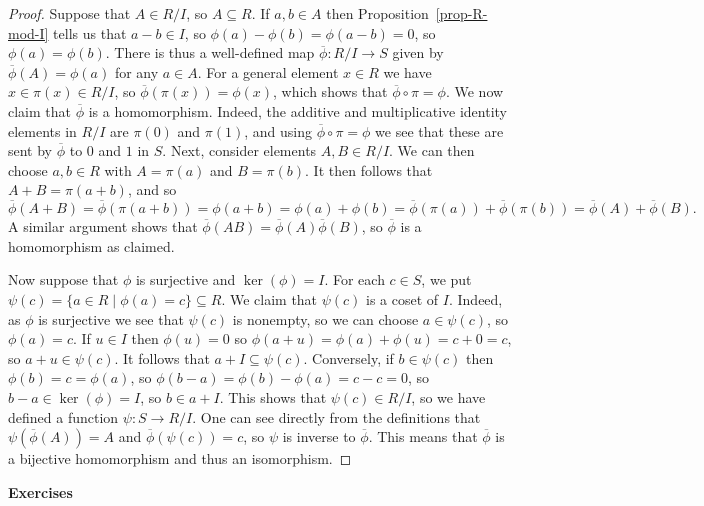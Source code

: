 \documentclass{amsart}
\newcommand{\ov}[1]     {\overline{#1}}
\newcommand{\st}        {\;|\;}
\newcommand{\sse}       {\subseteq}
\renewcommand{\:}{\colon}
\theoremstyle{definition}
\begin{document}
\begin{proof}
 Suppose that $A\in R/I$, so $A\sse R$.  If $a,b\in A$ then
 Proposition~\ref{prop-R-mod-I} tells us that $a-b\in I$, so
 $\phi(a)-\phi(b)=\phi(a-b)=0$, so $\phi(a)=\phi(b)$.  There is thus a
 well-defined map $\ov{\phi}\:R/I\to S$ given by
 $\ov{\phi}(A)=\phi(a)$ for any $a\in A$.  For a general element
 $x\in R$ we have $x\in\pi(x)\in R/I$, so $\ov{\phi}(\pi(x))=\phi(x)$,
 which shows that $\ov{\phi}\circ\pi=\phi$.  We now claim that
 $\ov{\phi}$ is a homomorphism.  Indeed, the additive and
 multiplicative identity elements in $R/I$ are $\pi(0)$ and $\pi(1)$,
 and using $\ov{\phi}\circ\pi=\phi$ we see that these are sent by
 $\ov{\phi}$ to $0$ and $1$ in $S$.  Next, consider elements
 $A,B\in R/I$.  We can then choose $a,b\in R$ with $A=\pi(a)$ and
 $B=\pi(b)$.  It then follows that $A+B=\pi(a+b)$, and so 
 \[ \ov{\phi}(A+B)=\ov{\phi}(\pi(a+b))=\phi(a+b)=\phi(a)+\phi(b)
     =\ov{\phi}(\pi(a))+\ov{\phi}(\pi(b))
     =\ov{\phi}(A)+\ov{\phi}(B).
 \]
 A similar argument shows that
 $\ov{\phi}(AB)=\ov{\phi}(A)\ov{\phi}(B)$, so $\ov{\phi}$ is a
 homomorphism as claimed.

 Now suppose that $\phi$ is surjective and $\ker(\phi)=I$.  For each
 $c\in S$, we put $\psi(c)=\{a\in R\st \phi(a)=c\}\sse R$.  We claim
 that $\psi(c)$ is a coset of $I$.  Indeed, as $\phi$ is surjective we
 see that $\psi(c)$ is nonempty, so we can choose $a\in\psi(c)$, so
 $\phi(a)=c$.  If $u\in I$ then $\phi(u)=0$ so
 $\phi(a+u)=\phi(a)+\phi(u)=c+0=c$, so $a+u\in\psi(c)$.  It follows
 that $a+I\sse\psi(c)$.  Conversely, if $b\in\psi(c)$ then
 $\phi(b)=c=\phi(a)$, so $\phi(b-a)=\phi(b)-\phi(a)=c-c=0$, so
 $b-a\in\ker(\phi)=I$, so $b\in a+I$.  This shows that
 $\psi(c)\in R/I$, so we have defined a function $\psi\:S\to R/I$.
 One can see directly from the definitions that $\psi(\ov{\phi}(A))=A$
 and $\ov{\phi}(\psi(c))=c$, so $\psi$ is inverse to $\ov{\phi}$.
 This means that $\ov{\phi}$ is a bijective homomorphism and thus an
 isomorphism. 
\end{proof}


\begin{center}
 \Large \textbf{Exercises}
\end{center}
\end{document}
